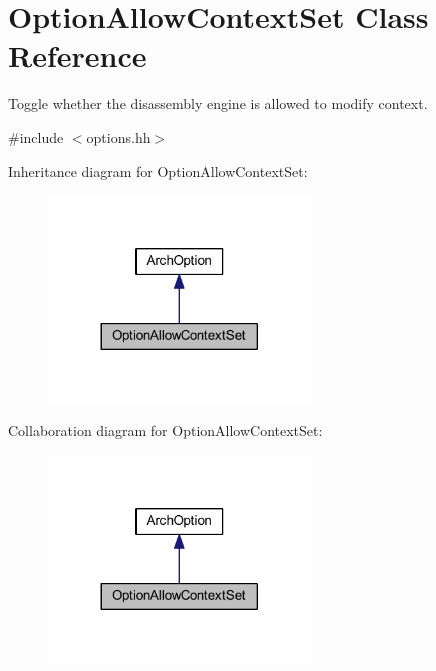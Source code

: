 \hypertarget{class_option_allow_context_set}{}\section{Option\+Allow\+Context\+Set Class Reference}
\label{class_option_allow_context_set}


Toggle whether the disassembly engine is allowed to modify context.  




{\ttfamily \#include $<$options.\+hh$>$}



Inheritance diagram for Option\+Allow\+Context\+Set\+:
\nopagebreak
\begin{figure}[H]
\begin{center}
\leavevmode
\includegraphics[width=197pt]{class_option_allow_context_set__inherit__graph}
\end{center}
\end{figure}


Collaboration diagram for Option\+Allow\+Context\+Set\+:
\nopagebreak
\begin{figure}[H]
\begin{center}
\leavevmode
\includegraphics[width=197pt]{class_option_allow_context_set__coll__graph}
\end{center}
\end{figure}
